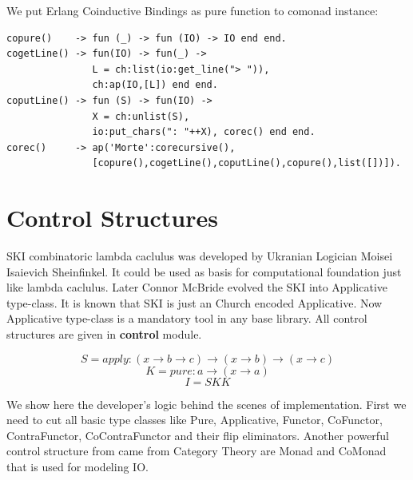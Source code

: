 \documentclass{article}
\begin{document}
We put Erlang Coinductive Bindings as pure function to comonad instance:

\begin{lstlisting}[mathescape=true]
copure()    -> fun (_) -> fun (IO) -> IO end end.
cogetLine() -> fun(IO) -> fun(_) ->
               L = ch:list(io:get_line("> ")),
               ch:ap(IO,[L]) end end.
coputLine() -> fun (S) -> fun(IO) ->
               X = ch:unlist(S),
               io:put_chars(": "++X), corec() end end.
corec()     -> ap('Morte':corecursive(),
               [copure(),cogetLine(),coputLine(),copure(),list([])]).
\end{lstlisting}

%

\newpage
\section{Control Structures}

SKI combinatoric lambda caclulus was developed by Ukranian Logician
Moisei Isaievich Sheinfinkel. It could be used as basis for computational
foundation just like lambda caclulus. Later Connor McBride \cite{McBride08} evolved the SKI
into Applicative type-class. It is known that SKI is just an Church encoded Applicative.
Now Applicative type-class is a mandatory tool in any base library.
All control structures are given in {\bf control} module.

\begin{equation}
 S = apply : (x \rightarrow b \rightarrow c) \rightarrow (x \rightarrow b) \rightarrow (x \rightarrow c)
\end{equation}
\begin{equation}
 K = pure  : a \rightarrow (x \rightarrow a)
\end{equation}
\begin{equation}
 I = S K K
\end{equation}

We show here the developer's logic behind the scenes of implementation. First we need
to cut all basic type classes like Pure, Applicative, Functor, CoFunctor,
ContraFunctor, CoContraFunctor and their flip eliminators. Another powerful control
structure from came from Category Theory are Monad and CoMonad that is used
for modeling IO.
\end{document}
